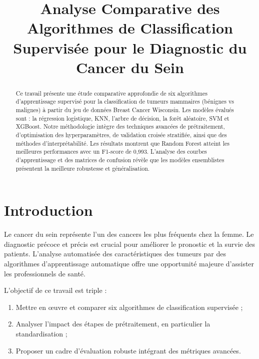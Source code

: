 \documentclass[conference]{IEEEtran}
\begin{document}
\title{Analyse Comparative des Algorithmes de Classification Supervisée pour le Diagnostic du Cancer du Sein}

\author{
}

\maketitle

\begin{abstract}
Ce travail présente une étude comparative approfondie de six algorithmes d'apprentissage supervisé pour la classification de tumeurs mammaires (bénignes vs malignes) à partir du jeu de données Breast Cancer Wisconsin. Les modèles évalués sont : la régression logistique, KNN, l'arbre de décision, la forêt aléatoire, SVM et XGBoost. Notre méthodologie intègre des techniques avancées de prétraitement, d'optimisation des hyperparamètres, de validation croisée stratifiée, ainsi que des méthodes d'interprétabilité. Les résultats montrent que Random Forest atteint les meilleures performances avec un F1-score de 0,993. L'analyse des courbes d'apprentissage et des matrices de confusion révèle que les modèles ensemblistes présentent la meilleure robustesse et généralisation.
\end{abstract}

\section{Introduction}

Le cancer du sein représente l'un des cancers les plus fréquents chez la femme. Le diagnostic précoce et précis est crucial pour améliorer le pronostic et la survie des patients. L'analyse automatisée des caractéristiques des tumeurs par des algorithmes d'apprentissage automatique offre une opportunité majeure d'assister les professionnels de santé.

L'objectif de ce travail est triple :
\begin{enumerate}
\item Mettre en œuvre et comparer six algorithmes de classification supervisée ;
\item Analyser l'impact des étapes de prétraitement, en particulier la standardisation ;
\item Proposer un cadre d'évaluation robuste intégrant des métriques avancées.
\end{enumerate}
\end{document}
